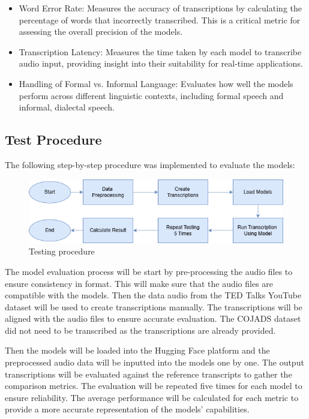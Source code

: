 \begin{itemize}
    \item Word Error Rate: Measures the accuracy of transcriptions by calculating the percentage of words that incorrectly transcribed. This is a critical metric for assessing the overall precision of the models.
    \item Transcription Latency: Measures the time taken by each model to transcribe audio input, providing insight into their suitability for real-time applications.
    \item Handling of Formal vs. Informal Language: Evaluates how well the models perform across different linguistic contexts, including formal speech and informal, dialectal speech.
\end{itemize}

\subsection{Test Procedure}
The following step-by-step procedure was implemented to evaluate the models:

\begin{figure}[!ht]
    \centering
    \includegraphics[width=1\textwidth]{mainmatter//images/step.png}
    \caption{Testing procedure }
\end{figure}

The model evaluation process will be start by pre-processing the audio files to ensure consistency in format. This will make sure that the audio files are compatible with the models. Then the data audio from the TED Talks YouTube dataset will be used to create transcriptions manually. The transcriptions will be aligned with the audio files to ensure accurate evaluation. The COJADS dataset did not need to be transcribed as the transcriptions are already provided. 

Then the models will be loaded into the Hugging Face platform and the preprocessed audio data will be inputted into the models one by one. The output transcriptions will be evaluated against the reference transcripts to gather the comparison metrics. The evaluation will be repeated five times for each model to ensure reliability. The average performance will be calculated for each metric to provide a more accurate representation of the models' capabilities. 

